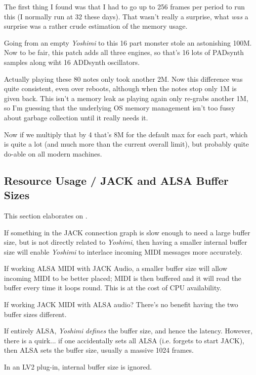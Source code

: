    The first thing I found was that I had to go up to 256 frames per period to
   run this (I normally run at 32 these days). That wasn't really a surprise,
   what \textsl{was} a surprise was a rather crude estimation of the memory
   usage.

   Going from an empty \textsl{Yoshimi} to this 16 part monster stole an
   astonishing 100M. Now to be fair, this patch adds all three engines, so
   that's 16 lots of PADsynth samples along wiht 16 ADDsynth oscillators.

   Actually playing these 80 notes only took another 2M. Now this difference
   was quite consistent, even over reboots, although when the notes stop only
   1M is given back. This isn't a memory leak as playing again only re-grabs
   another 1M, so I'm guessing that the underlying OS memory management isn't
   too fussy about garbage collection until it really needs it.

   Now if we multiply that by 4 that's 8M for the default max for each part,
   which is quite a lot (and much more than the current overall limit), but
   probably quite do-able on all modern machines.

\subsection{Resource Usage / JACK and ALSA Buffer Sizes}
\label{sec:resource_usage_jack_alsa_buffer_sizes}

   This section elaborates on
   .

   If something in the JACK connection
   graph is slow enough to need a large buffer
   size, but is not directly related to \textsl{Yoshimi},
   then having a smaller internal
   buffer size will enable \textsl{Yoshimi}
   to interlace incoming MIDI messages more accurately.

   If working ALSA MIDI with JACK Audio, a smaller buffer size will allow
   incoming MIDI to be better placed; MIDI is then buffered and it will read
   the buffer every time it loops round. This is at the cost of CPU
   availability.

   If working JACK MIDI with ALSA audio? There's no benefit having the
   two buffer sizes different.

   If entirely ALSA, \textsl{Yoshimi} \textsl{defines}
   the buffer size, and hence the latency.
   However, there is a quirk... if one accidentally sets all ALSA
   (i.e. forgets to start JACK),
   then ALSA sets the buffer size, usually a massive 1024 frames.

   In an LV2 plug-in, internal buffer size is ignored.

